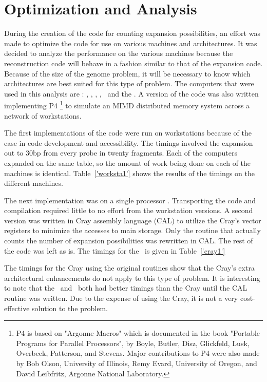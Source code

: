 \section{Optimization and Analysis}

During the creation of the code for counting expansion possibilities, an
effort was made to optimize the code for use on various machines and
architectures.  It was decided to analyze the performance on the various
machines because the reconstruction code will behave in a fashion similar
to that of the expansion code.  Because of the size of the genome problem,
it will be necessary to know which architectures are best suited for this
type of problem.  The computers that were used in this analysis are :
\ariel, \achilles, \hp, \gamma, \alxmp\ and the \delta.  A version of the 
code was also
written implementing P4
\footnote{P4 is based on "Argonne Macros" which is
documented in the book "Portable
Programs for Parallel Processors", by Boyle, Butler, Disz, Glickfeld, Lusk,
Overbeek, Patterson, and Stevens.  Major contributions to P4 were also made
by Bob Olson, University of Illinois, Remy Evard, University of Oregon, and
David Leibfritz, Argonne National Laboratory.}
to simulate an MIMD
distributed memory system across
a network of workstations.

The first implementations of the code were run on workstations because of
the ease in code development and accessibility.  The timings involved the
expansion out to 30bp from every probe in twenty fragments.  Each of the
computers expanded on the same table, so the amount of work being done on
each of the machines is identical.  Table~\ref{'worksta1'} shows the results
of the timings on the different machines.



The next implementation was on a single processor \alxmp.  Transporting the
code and compilation required little to no effort from the workstation
versions.  A second version was written in Cray assembly language (CAL) to
utilize the Cray's vector registers to minimize the accesses to main
storage.  Only the routine that actually counts the number of expansion
possibilities was rewritten in CAL.  The rest of the code was left as is.
The timings for the \xmp\ is given in Table~\ref{'cray1'}



The timings for the Cray using the original routines show that the Cray's
extra architectural enhancements do not apply to this type of problem.
It is interesting to note that the \achilles\ and \hp\ both had better
timings than the Cray until the CAL routine was written.  Due to the
expense of using the Cray, it is not a very cost-effective solution to the
problem.

